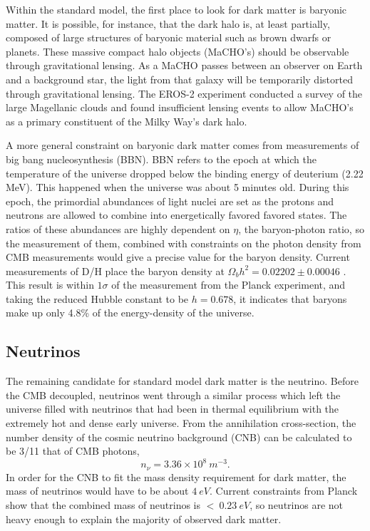Within the standard model, the first place to look for dark matter is baryonic matter. It is possible, for instance, that the dark halo is, at least partially, composed of large structures of baryonic material such as brown dwarfs or planets. These massive compact halo objects (MaCHO's) should be observable through gravitational lensing. As a MaCHO passes between an observer on Earth and a background star, the light from that galaxy will be temporarily distorted through gravitational lensing. The EROS-2 experiment conducted a survey of the large Magellanic clouds and found insufficient lensing events to allow MaCHO's as a primary constituent of the Milky Way's dark halo\cite{macho}.

A more general constraint on baryonic dark matter comes from measurements of big bang nucleosynthesis (BBN). BBN refers to the epoch at which the temperature of the universe dropped below the binding energy of deuterium (2.22 MeV). This happened when the universe was about 5 minutes old. During this epoch, the primordial abundances of light nuclei are set as the protons and neutrons are allowed to combine into energetically favored favored states. The ratios of these abundances are highly dependent on $\eta$, the baryon-photon ratio, so the measurement of them, combined with constraints on the photon density from CMB measurements would give a precise value for the baryon density\cite{ryden}. Current measurements of D/H place the baryon density at $\Omega_{b} h^{2} = 0.02202 \pm 0.00046$ \cite{bbn}. This result is within $1\sigma$ of the measurement from the Planck experiment, and taking the reduced Hubble constant to be $h = 0.678$, it indicates that baryons make up only 4.8\% of the energy-density of the universe\cite{planck2015}.


\subsection{Neutrinos}
The remaining candidate for standard model dark matter is the neutrino. Before the CMB decoupled, neutrinos went through a similar process which left the universe filled with neutrinos that had been in thermal equilibrium with the extremely hot and dense early universe. From the annihilation cross-section, the number density of the cosmic neutrino background (CNB) can be calculated to be 3/11 that of CMB photons\cite{ryden},
\begin{equation}
n_{\nu}=3.36 \times 10^{8} \ m^{-3}.
\end{equation}
In order for the CNB to fit the mass density requirement for dark matter, the mass of neutrinos would have to be about $4 \ eV$.\cite{ryden}  Current constraints from Planck show that the combined mass of neutrinos is $< \ 0.23 \ eV$\cite{planck2015}, so neutrinos are not heavy enough to explain the majority  of observed dark matter.


